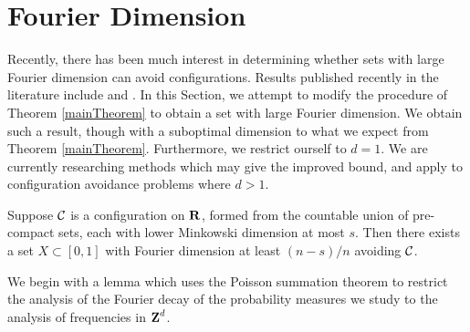 \section{Fourier Dimension}

Recently, there has been much interest in determining whether sets with large Fourier dimension can avoid configurations. Results published recently in the literature include \cite{PramanikLaba} and \cite{Shmerkin}. In this Section, we attempt to modify the procedure of Theorem \ref{mainTheorem} to obtain a set with large Fourier dimension. We obtain such a result, though with a suboptimal dimension to what we expect from Theorem \ref{mainTheorem}. Furthermore, we restrict ourself to $d = 1$. We are currently researching methods which may give the improved bound, and apply to configuration avoidance problems where $d > 1$.

\begin{theorem} \label{FourierTheorem}
    Suppose $\operatorname{\mathcal{C}}$ is a configuration on $\operatorname{\mathbf{R}}$, formed from the countable union of pre-compact sets, each with lower Minkowski dimension at most $s$. Then there exists a set $X \subset [0,1]$ with Fourier dimension at least $(n - s)/n$ avoiding $\operatorname{\mathcal{C}}$.
\end{theorem}

We begin with a lemma which uses the Poisson summation theorem to restrict the analysis of the Fourier decay of the probability measures we study to the analysis of frequencies in $\operatorname{\mathbf{Z}}^d$.

